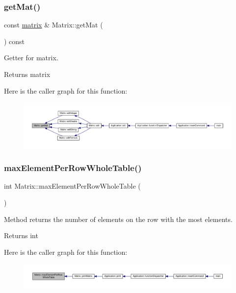 \subsubsection{\texorpdfstring{get\+Mat()}{getMat()}}
{\footnotesize\ttfamily const \hyperlink{formula_8h_a869e2a5deeb3daa4c82d6bc91cf20d92}{matrix} \& Matrix\+::get\+Mat (\begin{DoxyParamCaption}{ }\end{DoxyParamCaption}) const}

Getter for matrix. \begin{DoxyReturn}{Returns}
matrix 
\end{DoxyReturn}
Here is the caller graph for this function\+:
\nopagebreak
\begin{figure}[H]
\begin{center}
\leavevmode
\includegraphics[width=350pt]{class_matrix_a52d82641f52304c9b6525747cd7f960c_icgraph}
\end{center}
\end{figure}
\mbox{\label{class_matrix_a8620c5426a31cf8fe0072df32bb3f65d}} 
\subsubsection{\texorpdfstring{max\+Element\+Per\+Row\+Whole\+Table()}{maxElementPerRowWholeTable()}}
{\footnotesize\ttfamily int Matrix\+::max\+Element\+Per\+Row\+Whole\+Table (\begin{DoxyParamCaption}{ }\end{DoxyParamCaption})\hspace{0.3cm}{\ttfamily [private]}}

Method returns the number of elements on the row with the most elements. \begin{DoxyReturn}{Returns}
int 
\end{DoxyReturn}
Here is the caller graph for this function\+:
\nopagebreak
\begin{figure}[H]
\begin{center}
\leavevmode
\includegraphics[width=350pt]{class_matrix_a8620c5426a31cf8fe0072df32bb3f65d_icgraph}
\end{center}
\end{figure}
\mbox{\label{class_matrix_a60dac9b70e73a12d2adb32d6be9ff65d}} 
